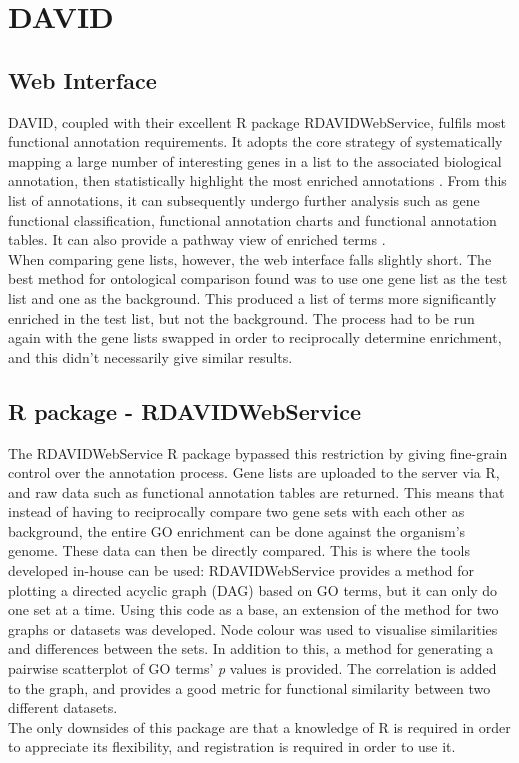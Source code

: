 \documentclass[11pt, oneside]{article}
\begin{document}
\section*{DAVID}
\subsection*{Web Interface}
DAVID, coupled with their excellent R package RDAVIDWebService, fulfils most functional annotation requirements. It adopts the core strategy of systematically mapping a large number of interesting genes in a list to the associated biological annotation, then statistically highlight the most enriched annotations \cite{David08}. From this list of annotations, it can subsequently undergo further analysis such as gene functional classification, functional annotation charts and functional annotation tables. It can also provide a pathway view of enriched terms \cite{David08}.\\
When comparing gene lists, however, the web interface falls slightly short. The best method for ontological comparison found was to use one gene list as the test list and one as the background. This produced a list of terms more significantly enriched in the test list, but not the background. The process had to be run again with the gene lists swapped in order to reciprocally determine enrichment, and this didn't necessarily give similar results.
\subsection*{R package - RDAVIDWebService}
The RDAVIDWebService R package bypassed this restriction by giving fine-grain control over the annotation process. Gene lists are uploaded to the server via R, and raw data such as functional annotation tables are returned. This means that instead of having to reciprocally compare two gene sets with each other as background, the entire GO enrichment can be done against the organism's genome. These data can then be directly compared. This is where the tools developed in-house can be used: RDAVIDWebService provides a method for plotting a directed acyclic graph (DAG) based on GO terms, but it can only do one set at a time. Using this code as a base, an extension of the method for two graphs or datasets was developed. Node colour was used to visualise similarities and differences between the sets. In addition to this, a method for generating a pairwise scatterplot of GO terms' \emph{p} values is provided. The correlation is added to the graph, and provides a good metric for functional similarity between two different datasets.\\
The only downsides of this package are that a knowledge of R is required in order to appreciate its flexibility, and registration is required in order to use it.
\end{document}
